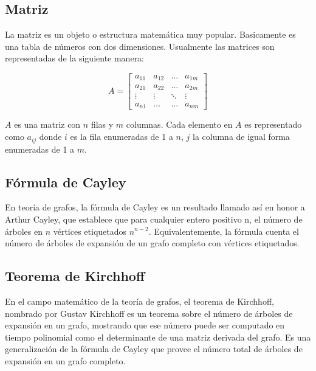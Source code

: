 \subsection{Matriz}
La matriz es un objeto o estructura matemática muy popular. Basicamente es una tabla de números con dos dimensiones. Usualmente las matrices son representadas de la siguiente manera:



$$A=\begin{bmatrix}
	a_{11} & a_{12} & \ldots & a_{1m} \\ 
	a_{21} & a_{22} & \ldots & a_{2m} \\ 
	\vdots & \vdots & \ddots & \vdots \\ 
	a_{n1} & \ldots & \ldots & a_{nm}
\end{bmatrix} $$ 

\vspace*{0.3in}

$A$ es una matriz con $n$ filas y $m$ columnas. Cada elemento en $A$ es representado como $a_{ij}$ donde $i$ es la fila enumeradas de 1 a $n$, $j$ la columna de igual forma enumeradas de 1 a $m$.

\subsection{Fórmula de Cayley}
En teoría de grafos, la fórmula de Cayley es un resultado llamado así en honor a Arthur Cayley, que establece que para cualquier entero positivo n, el número de árboles en $n$ vértices etiquetados  $n^{n-2}$. Equivalentemente, la fórmula cuenta el número de árboles de expansión de un grafo completo con vértices etiquetados. 

\subsection{Teorema de Kirchhoff}
En el campo matemático de la teoría de grafos, el teorema de Kirchhoff, nombrado por Gustav Kirchhoff es un teorema sobre el número de árboles de expansión en un grafo, mostrando que ese número puede ser computado en tiempo polinomial como el determinante de una matriz derivada del grafo. Es una generalización de la fórmula de Cayley que provee el número total de árboles de expansión en un grafo completo. 

